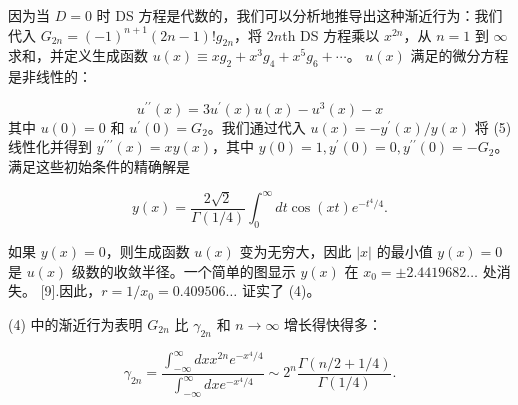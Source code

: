 \documentclass[UTF8]{article}
\begin{document}
因为当 $D=0$ 时 DS 方程是代数的，我们可以分析地推导出这种渐近行为：我们代入 $G_{2 n}=(-1)^{n+1}(2 n-1) ! g_{2 n}$，将 $2 n$th DS 方程乘以 $x^{2 n}$，从 $n=1$ 到 $\infty$ 求和，并定义生成函数 $u(x) \equiv x g_2+x^3 g_4+x^5 g_6+\cdots$。 $u(x)$ 满足的微分方程是非线性的：




$$u^{\prime \prime}(x)=3 u^{\prime}(x) u(x)-u^3(x)-x
$$ 其中 $u(0)=0$ 和 $u^{\prime}(0)=G_2$。我们通过代入 $u(x)=-y^{\prime}(x) / y(x)$ 将 (5) 线性化并得到 $y^{\prime \prime \prime}(x)=x y(x)$，其中 $y(0)=1, y^{\prime}(0)=0, y^{\prime \prime}(0)=-G_2$。满足这些初始条件的精确解是




$$y(x)=\frac{2 \sqrt{2}}{\Gamma(1 / 4)} \int_0^{\infty} d t \cos (x t) e^{-t^4 / 4} .
$$


如果 $y(x)=0$，则生成函数 $u(x)$ 变为无穷大，因此 $|x|$ 的最小值 $y(x)=0$ 是 $u(x)$ 级数的收敛半径。一个简单的图显示 $y(x)$ 在 $x_0= \pm 2.4419682 \ldots$ 处消失。 [9].因此，$r=1 / x_0=0.409506 \ldots$ 证实了 (4)。



(4) 中的渐近行为表明 $G_{2 n}$ 比 $\gamma_{2 n}$ 和 $n \rightarrow \infty$ 增长得快得多：


$$
\gamma_{2 n}=\frac{\int_{-\infty}^{\infty} d x x^{2 n} e^{-x^4 / 4}}{\int_{-\infty}^{\infty} d x e^{-x^4 / 4}} \sim 2^n \frac{\Gamma(n / 2+1 / 4)}{\Gamma(1 / 4)} .
$$
\end{document}
